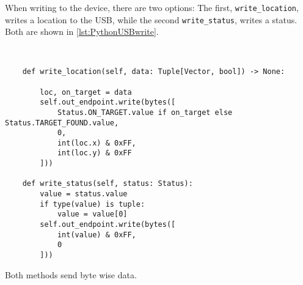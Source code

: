 When writing to the device, there are two options:
The first, \texttt{write\_location}, writes a location to the USB, while the second \texttt{write\_status}, writes a status.
Both are shown in \autoref{lst:PythonUSBwrite}.

\begin{lstlisting}[label={lst:PythonUSBwrite},caption={Writing from the USB port connected to the NXT}]

	
	def write_location(self, data: Tuple[Vector, bool]) -> None:
	
		loc, on_target = data
		self.out_endpoint.write(bytes([
			Status.ON_TARGET.value if on_target else Status.TARGET_FOUND.value,
			0,
			int(loc.x) & 0xFF,
			int(loc.y) & 0xFF
		]))
	
	def write_status(self, status: Status):
		value = status.value
		if type(value) is tuple:
			value = value[0]
		self.out_endpoint.write(bytes([
			int(value) & 0xFF,
			0
		]))

\end{lstlisting}
Both methods send byte wise data.